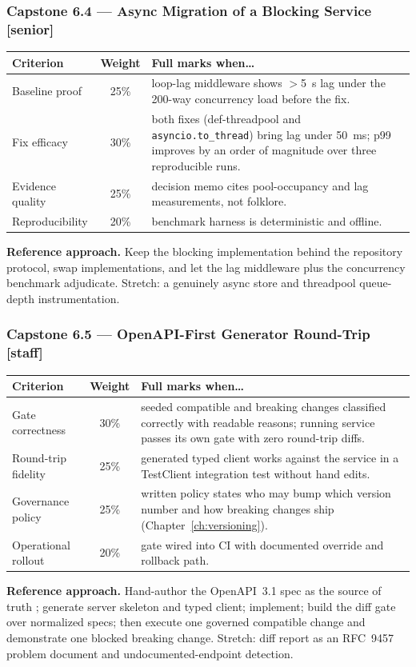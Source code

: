 \subsubsection*{Capstone 6.4 --- Async Migration of a Blocking Service [senior]}
\begin{center}\small
\begin{tabularx}{\textwidth}{l c X}
\toprule
\textbf{Criterion} & \textbf{Weight} & \textbf{Full marks when\ldots} \\
\midrule
Baseline proof & 25\% & loop-lag middleware shows $>$5~s lag under the 200-way concurrency load before the fix. \\
Fix efficacy & 30\% & both fixes (def-threadpool and \texttt{asyncio.to\_thread}) bring lag under 50~ms; p99 improves by an order of magnitude over three reproducible runs. \\
Evidence quality & 25\% & decision memo cites pool-occupancy and lag measurements, not folklore. \\
Reproducibility & 20\% & benchmark harness is deterministic and offline. \\
\bottomrule
\end{tabularx}
\end{center}
\textbf{Reference approach.} Keep the blocking implementation behind the
repository protocol, swap implementations, and let the lag middleware plus
the concurrency benchmark adjudicate. Stretch: a genuinely async store and
threadpool queue-depth instrumentation.

\subsubsection*{Capstone 6.5 --- OpenAPI-First Generator Round-Trip [staff]}
\begin{center}\small
\begin{tabularx}{\textwidth}{l c X}
\toprule
\textbf{Criterion} & \textbf{Weight} & \textbf{Full marks when\ldots} \\
\midrule
Gate correctness & 30\% & seeded compatible and breaking changes classified correctly with readable reasons; running service passes its own gate with zero round-trip diffs. \\
Round-trip fidelity & 25\% & generated typed client works against the service in a TestClient integration test without hand edits. \\
Governance policy & 25\% & written policy states who may bump which version number and how breaking changes ship (Chapter~\ref{ch:versioning}). \\
Operational rollout & 20\% & gate wired into CI with documented override and rollback path. \\
\bottomrule
\end{tabularx}
\end{center}
\textbf{Reference approach.} Hand-author the OpenAPI~3.1 spec as the
source of truth \cite{openapi31}; generate server skeleton and typed
client; implement; build the diff gate over normalized specs; then execute
one governed compatible change and demonstrate one blocked breaking change.
Stretch: diff report as an RFC~9457 problem document and
undocumented-endpoint detection.

